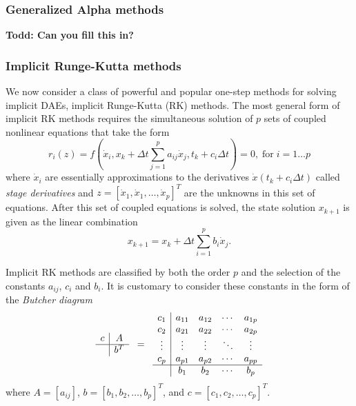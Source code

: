 \documentclass[pdf,ps2pdf,11pt]{SANDreport}
\begin{document}
\subsubsection{Generalized Alpha methods}

\cite{GeneralizedAlpha}
{}\textbf{Todd: Can you fill this in?}

\subsubsection{Implicit Runge-Kutta methods}
\label{rythmos:sec:implicit-rk}

We now consider a class of powerful and popular one-step methods for solving
implicit DAEs, implicit Runge-Kutta (RK) methods.  The most general form
of implicit RK methods requires the simultaneous solution of $p$ sets
of coupled nonlinear equations that take the form
%
\begin{equation}
r_i(z) = f\left( \dot{x}_i, x_k + \Delta t \sum_{j=1}^{p} a_{ij} \dot{x}_j,
t_k + c_i \Delta t \right) = 0,
\; \mbox{for} \; i = 1 \ldots p
\label{rythmos:eqn:irk_dae_ne}
\end{equation}
%
where $\dot{x}_i$ are essentially approximations to the derivatives
$\dot{x}(t_k + c_i \Delta t)$ called {}\textit{stage derivatives} and $z = [
{}\dot{x}_1, {}\dot{x}_1, {}\ldots, {}\dot{x}_p ]^T$ are the unknowns in this
set of equations.  After this set of coupled equations is solved, the state
solution $x_{k+1}$ is given as the linear combination
%
\begin{equation}
x_{k+1} = x_k + \Delta t \sum_{i=1}^{p} b_i \dot{x}_j.
\end{equation}

Implicit RK methods are classified by both the order $p$ and the selection of
the constants $a_{ij}$, $c_i$ and $b_i$.  It is customary to consider these
constants in the form of the {}\textit{Butcher diagram}
%
\[
\begin{array}{c|c}
c & A \\
\hline
  & b^T
\end{array}
\; \; = \; \;
\begin{array}{c|cccc}
c_1 & a_{11} & a_{12} & \cdots & a_{1p} \\
c_2 & a_{21} & a_{22} & \cdots & a_{2p} \\
\vdots & \vdots & \vdots & \ddots & \vdots \\
c_p & a_{p1} & a_{p2} & \cdots & a_{pp} \\
\hline
 & b_1 & b_2 & \cdots & b_p
\end{array}
\]
%
where $A = [a_{ij}]$, $b = [b_1, b_2, {}\ldots, b_p]^T$, and $c =
[c_1, c_2, {}\ldots, c_p]^T$.
\end{document}

